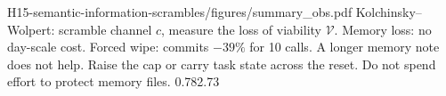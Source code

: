 {H15-semantic-information-scrambles/figures/summary_obs.pdf}
{Kolchinsky--Wolpert: scramble channel $c$, measure the loss of viability $\mathcal V$.}
{Memory loss: no day-scale cost. Forced wipe: commits $-39\%$ for 10 calls. A longer memory note does not help.}
{Raise the cap or carry task state across the reset. Do not spend effort to protect memory files.}
{0.78}{2.73}
